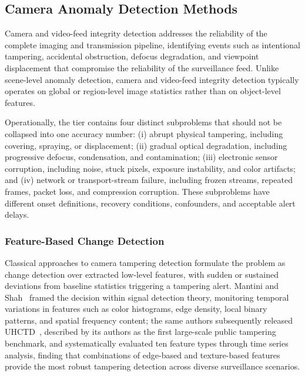 \documentclass[10pt,a4paper]{article}
\begin{document}
\subsection{Camera Anomaly Detection Methods}
\label{subsec:camera_anomaly}

Camera and video-feed integrity detection addresses the reliability of the complete imaging and transmission pipeline, identifying events such as intentional tampering, accidental obstruction, defocus degradation, and viewpoint displacement that compromise the reliability of the surveillance feed. Unlike scene-level anomaly detection, camera and video-feed integrity detection typically operates on global or region-level image statistics rather than on object-level features.

Operationally, the tier contains four distinct subproblems that should not be collapsed into one accuracy number: (i) abrupt physical tampering, including covering, spraying, or displacement; (ii) gradual optical degradation, including progressive defocus, condensation, and contamination; (iii) electronic sensor corruption, including noise, stuck pixels, exposure instability, and color artifacts; and (iv) network or transport-stream failure, including frozen streams, repeated frames, packet loss, and compression corruption. These subproblems have different onset definitions, recovery conditions, confounders, and acceptable alert delays.

\subsubsection{Feature-Based Change Detection}

Classical approaches to camera tampering detection formulate the problem as change detection over extracted low-level features, with sudden or sustained deviations from baseline statistics triggering a tampering alert. Mantini and Shah~\citeyearpar{mantini2017signal} framed the decision within signal detection theory, monitoring temporal variations in features such as color histograms, edge density, local binary patterns, and spatial frequency content; the same authors subsequently released UHCTD~\citep{mantini2019uhctd}, described by its authors as the first large-scale public tampering benchmark, and systematically evaluated ten feature types through time series analysis, finding that combinations of edge-based and texture-based features provide the most robust tampering detection across diverse surveillance scenarios.
\end{document}
